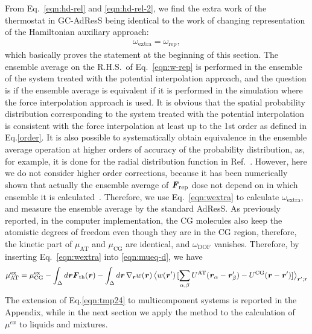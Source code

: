 \documentclass[a4paper,preprint,unsortedaddress]{revtex4-1}
\newcommand{\vect}[1]{\textbf{\textit{#1}}}
\newcommand{\dof}{{\textrm{DOF}}}
\newcommand{\AT}{{\textrm{{AT}}}}
\newcommand{\CG}{{\textrm{CG}}}
\newcommand{\HY}{{\Delta}}
\newcommand{\thf}{{\textrm{th}}}
\newcommand{\res}{{\textrm{rep}}}
\newcommand{\ext}{{\textrm{extra}}}
\newcommand{\exc}{{\textrm{ex}}}
\begin{document}
{From Eq.~\eqref{eqn:hd-rel} and \eqref{eqn:hd-rel-2}, we
find the extra work of the thermostat in GC-AdResS being identical to the work of changing
representation of the Hamiltonian auxiliary approach:
\begin{align}\label{eqn:wextra}
  \omega_\ext = \omega_\res,
\end{align}
which basically proves the statement at the beginning of this section.  The ensemble
average on the R.H.S.~of Eq.~\eqref{eqn:w-rep} is performed in the
ensemble of the system treated with the potential interpolation approach, and the question is if the ensemble average is equivalent if it is performed in the simulation where the force
interpolation approach is used.  It is obvious that the spatial probability distribution corresponding to the system treated with the potential interpolation is consistent with the force
interpolation at least up to the 1st order as defined in Eq.\ref{order}.  It is also
possible to systematically obtain equivalence in the ensemble average operation  at higher orders of accuracy of the probability distribution, as, for example, it is done for the radial distribution function in Ref.~\cite{jctchan}.
However, here we do not consider higher order corrections, because it
has been numerically shown that actually the ensemble average of
$\vect F_\res$ dose not depend on in which ensemble it is
calculated~\cite{prx}. Therefore, we use Eq.~\eqref{eqn:wextra} to
calculate $\omega_\ext$, and measure the ensemble average by the
standard AdResS.  As previously reported, in the computer implementation, the CG
molecules also keep the atomistic degrees of freedom even though they
are in the CG region, therefore, the kinetic part of $\mu_\AT$ and
$\mu_\CG$ are identical, and $\omega_\dof$ vanishes. Therefore,
by inserting Eq.~\eqref{eqn:wextra} into \eqref{eqn:mueq-d}, we have
\begin{align}\label{eqn:tmp24}
  \mu_\AT^\exc = \mu_\CG^\exc - \int_\HY d\vect r \vect F_\thf(\vect r)
-\int_\HY d \vect r\,\nabla_{\vect r}w(\vect r)\,
\big\langle w(\vect r')\, [\sum_{\alpha,\beta}U^\AT(\vect r_\alpha-\vect r'_\beta) - U^\CG(\vect r-\vect r')]\big\rangle_{\vect r'; \vect r}
\end{align}
The extension of Eq.\ref{eqn:tmp24} to multicomponent systems is reported in the Appendix, while in the next section we apply the method to the calculation of $\mu^{ex}$ to liquids and mixtures.} 
\end{document}

